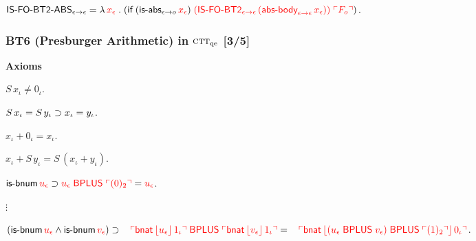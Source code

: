 \documentclass[t,12pt,numbers,fleqn]{beamer}
\newcommand{\churchqe}{$\mbox{\sc ctt}_{\rm qe}$}
\newcommand{\syn}[1]{\textcolor{red}{#1}}
\begin{document}
\begin{frame}
    \setcounter{enumi}{6}

    \item $\mname{IS-FO-BT2-ABS}_{\epsilon \tarrow \epsilon} = {}\newline
    \LambdaApp \syn{x_\epsilon} \mdot 
    (\If \; (\mname{is-abs}_{\epsilon \tarrow o} \, \syn{x_\epsilon}) \;
    \syn{(\mname{IS-FO-BT2}_{\epsilon \tarrow \epsilon} \,
    (\mname{abs-body}_{\epsilon \tarrow \epsilon} \, x_\epsilon))} \;
    \syn{\synbrack{F_o}})$.

  \ee

\ei
\end{frame}


\begin{frame}
\frametitle{BT6 (Presburger Arithmetic) in {\churchqe} [3/5]}
\small
\bi

  \item[] \textbf{Axioms}

  \be

    \item $S \, x_\iota \not= 0_\iota$.

    \item $S \, x_\iota = S \, y_\iota \supset x_\iota =
      y_\iota$.

    \item $x_\iota + 0_\iota = x_\iota$.

    \item $x_\iota + S \, y_\iota = S \, (x_\iota + y_\iota)$.

    \item $\mname{is-bnum} \, \syn{u_\epsilon} \Implies
      \syn{u_\epsilon \; \mname{BPLUS} \; \synbrack{(0)_2}} =
      \syn{u_\epsilon}$.

    \item[] $\vdots$

    \setcounter{enumi}{14}

    \item $(\mname{is-bnum} \, \syn{u_\epsilon} \Andd \mname{is-bnum}
      \, \syn{v_\epsilon}) \Implies {}\newline
        \hspace*{2ex} \syn{\synbrack{\mname{bnat} \,
            \commabrack{u_\epsilon} \, 1_\iota} \; \mname{BPLUS} \;
          \synbrack{\mname{bnat} \, \commabrack{v_\epsilon} \, 1_\iota}} = {}\newline
        \hspace*{2ex}\syn{\synbrack{\mname{bnat} \,
            \commabrack{(u_\epsilon \; \mname{BPLUS} \; v_\epsilon)
              \; \mname{BPLUS} \; \synbrack{(1)_2}} \, 0_\iota}}$.


\end{frame}
\end{document}
